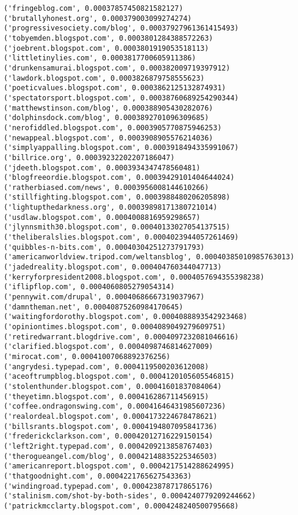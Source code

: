\documentclass[11pt]{article}
\begin{document}
\begin{Verbatim}[commandchars=\\\{\}]
('fringeblog.com', 0.00037857450821582127)
('brutallyhonest.org', 0.000379003099274274)
('progressivesociety.com/blog', 0.00037927961361415493)
('tobyemden.blogspot.com', 0.0003801284388572263)
('joebrent.blogspot.com', 0.0003801919053518113)
('littletinylies.com', 0.0003817700605911386)
('drunkensamurai.blogspot.com', 0.000382009719397912)
('lawdork.blogspot.com', 0.0003826879758555623)
('poeticvalues.blogspot.com', 0.0003862125132874931)
('spectatorsport.blogspot.com', 0.00038760689254290344)
('matthewstinson.com/blog', 0.000388905430282076)
('dolphinsdock.com/blog', 0.0003892701096309685)
('nerofiddled.blogspot.com', 0.0003905770875946253)
('newappeal.blogspot.com', 0.0003908905576214036)
('simplyappalling.blogspot.com', 0.0003918494335991067)
('billrice.org', 0.00039232202207186047)
('jdeeth.blogspot.com', 0.0003934347478560481)
('blogfreeordie.blogspot.com', 0.00039429101404644024)
('ratherbiased.com/news', 0.0003956008144610266)
('stillfighting.blogspot.com', 0.0003988480206205898)
('lightupthedarkness.org', 0.00039898171380721014)
('usdlaw.blogspot.com', 0.0004008816959298657)
('jlynnsmith30.blogspot.com', 0.00040133027054137515)
('theliberalslies.blogspot.com', 0.0004023944057261469)
('quibbles-n-bits.com', 0.00040304251273791793)
('americanworldview.tripod.com/weltansblog', 0.00040385010985763013)
('jadedreality.blogspot.com', 0.000404760344047713)
('kerryforpresident2008.blogspot.com', 0.0004057694355398238)
('iflipflop.com', 0.0004060805279054314)
('pennywit.com/drupal', 0.00040686667319037967)
('damntheman.net', 0.00040875260984170645)
('waitingfordorothy.blogspot.com', 0.0004088893542923468)
('opiniontimes.blogspot.com', 0.0004089049279609751)
('retiredwarrant.blogdrive.com', 0.0004097232081046616)
('clarified.blogspot.com', 0.0004098746814627009)
('mirocat.com', 0.00041007068892376256)
('angrydesi.typepad.com', 0.0004119500203612008)
('aceoftrumpblog.blogspot.com', 0.0004120105605546815)
('stolenthunder.blogspot.com', 0.00041601837084064)
('theyetimn.blogspot.com', 0.000416286711456915)
('coffee.ondragonswing.com', 0.00041646431985607236)
('realordeal.blogspot.com', 0.0004173224678478621)
('billsrants.blogspot.com', 0.0004194807095841736)
('frederickclarkson.com', 0.00042012716229150154)
('left2right.typepad.com', 0.0004209213858767403)
('therogueangel.com/blog', 0.00042148835225346503)
('americanreport.blogspot.com', 0.0004217514288624995)
('thatgoodnight.com', 0.0004221765627543363)
('windingroad.typepad.com', 0.000423878717865176)
('stalinism.com/shot-by-both-sides', 0.0004240779209244662)
('patrickmcclarty.blogspot.com', 0.0004248240500795668)

\end{Verbatim}
\end{document}
